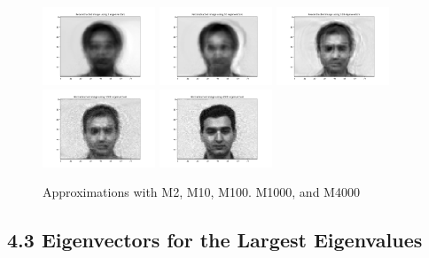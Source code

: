 \documentclass[12pt]{article}
\begin{document}
\begin{figure}[H]
    \centering
    \includegraphics[width=0.3\textwidth]{eigenface_M2.png}
    \includegraphics[width=0.3\textwidth]{eigenface_M10.png}
    \includegraphics[width=0.3\textwidth]{eigenface_M100.png}
    \includegraphics[width=0.3\textwidth]{eigenface_M1000.png}
    \includegraphics[width=0.3\textwidth]{eigenface_M4000.png}
    \caption{Approximations with M2, M10, M100. M1000, and M4000}
\end{figure}

\subsection*{4.3 Eigenvectors for the Largest Eigenvalues}
\end{document}
